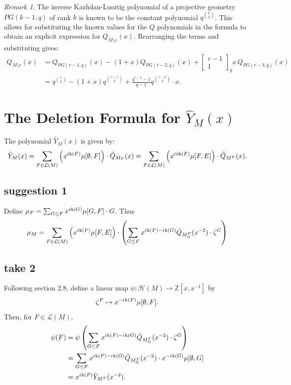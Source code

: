 \documentclass[11pt]{article}
\newcommand{\calL}{\mathcal{L}}
\newcommand{\calH}{\mathcal{H}}
\newcommand{\bz}{\mathbb{Z}}
\newcommand{\rank}{\normalfont\text{rk}}
\newcommand{\corank}{\normalfont\text{crk}}
\newcommand{\qbinom}[2]{\begin{bmatrix} #1 \\ #2 \end{bmatrix}_q}
\theoremstyle{remark}
\newtheorem*{remark}{Remark} %
\begin{document}
\begin{remark}
    The inverse Kazhdan-Lusztig polynomial of a projective geometry $PG(k-1,q)$ of rank $k$ is known to be the constant polynomial $q^{\binom{k}{2}}$. This allows for substituting the known values for the $Q$ polynomials in the formula to obtain an explicit expression for $Q_{M\setminus e}(x)$. Rearranging the terms and substituting gives:
    \begin{align*}
        Q_{M\setminus e}(x) & = Q_{PG(r-1,q)}(x) - (1+x)Q_{PG(r-2,q)}(x) + \qbinom{r-1}{1} x \, Q_{PG(r-3,q)}(x)               \\
                            & = q^{\binom{r}{2}} - (1+x)q^{\binom{r-1}{2}} + \frac{q^{r-1}-1}{q-1} q^{\binom{r-2}{2}}\cdot x .
    \end{align*}
\end{remark}

\section{The Deletion Formula for $\hat{Y}_M(x)$} \label{sec:deletion_formula_hatY}
The polynomial $\hat{Y}_M(x)$ is given by:
\[
    \hat{Y}_M(x) = \sum_{F \in \calL(M)} \left( x^{\rank(F)}\mu[\emptyset,F] \right) \cdot \hat{Q}_{M_F}(x)
    = \sum_{F \in \calL(M)} \left( x^{\corank(F)}\mu[F,E] \right) \cdot \hat{Q}_{M^F}(x).
\]

\subsection{suggestion 1}
Define $\mu_F = \sum_{G \leq F} x^{\rank(G)}\mu[G,F]\cdot G$. Thus
\begin{align*}
    \mu_M & = \sum_{F \in \calL(M)} \left( x^{\rank(F)}\mu[F,E] \right) \cdot \left( \sum_{G \leq F} x^{\rank(F) - \rank(G)} \hat{Q}_{M_G^F}(x^{-2}) \cdot \zeta^G \right) \\
\end{align*}

\subsection{take 2}
Following \cite{braden-vysogorets} section 2.8, define a linear map $\psi:\calH(M) \to \bz[x, x^{-1}]$ by
\[
    \zeta^F \mapsto x^{-\rank(F)}\mu[\emptyset,F].
\]
Then, for $F \in \calL(M)$,
\begin{align*}
    \psi(F) & = \psi\left(\sum_{G \leq F} x^{\rank(F) - \rank(G)} \hat{Q}_{M_G^F}(x^{-2}) \cdot \zeta^G\right)    \\
            & = \sum_{G \leq F} x^{\rank(F) - \rank(G)}\hat{Q}_{M_G^F}(x^{-2})\cdot x^{-\rank(G)}\mu[\emptyset,G] \\
            & = x^{\rank(F)}\hat{Y}_{M^F}(x^{-2}).
\end{align*}
\end{document}
